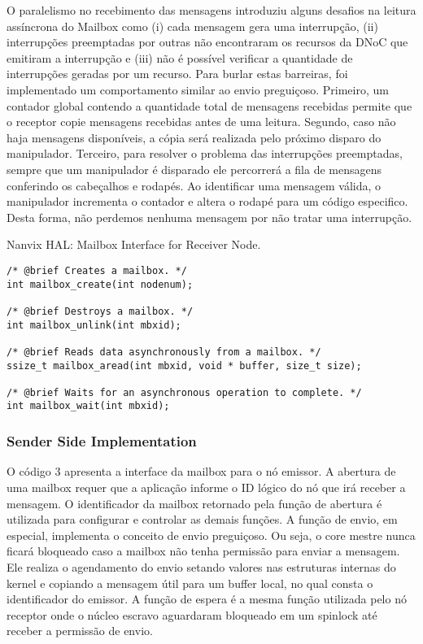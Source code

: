 				O paralelismo no recebimento das mensagens introduziu alguns desafios na leitura assíncrona do Mailbox como 
				(i) cada mensagem gera uma interrupção,
				(ii) interrupções preemptadas por outras não encontraram os recursos da DNoC que emitiram a interrupção e
				(iii) não é possível verificar a quantidade de interrupções geradas por um recurso.
				Para burlar estas barreiras, foi implementado um comportamento similar ao envio preguiçoso.
				Primeiro, um contador global contendo a quantidade total de mensagens recebidas permite que o receptor copie mensagens recebidas antes de uma leitura.
				Segundo, caso não haja mensagens disponíveis, a cópia será realizada pelo próximo disparo do manipulador.
				Terceiro, para resolver o problema das interrupções preemptadas, sempre que um manipulador é disparado ele percorrerá a fila de mensagens conferindo os cabeçalhos e rodapés.
				Ao identificar uma mensagem válida, o manipulador incrementa o contador e altera o rodapé para um código especifico.
				Desta forma, não perdemos nenhuma mensagem por não tratar uma interrupção.

\begin{listing}[!tb]
\caption{Nanvix HAL: Mailbox Interface for Receiver Node.}
\label{code:hal-mailbox-receiver}
\begin{verbatim}
/* @brief Creates a mailbox. */
int mailbox_create(int nodenum);

/* @brief Destroys a mailbox. */
int mailbox_unlink(int mbxid);

/* @brief Reads data asynchronously from a mailbox. */
ssize_t mailbox_aread(int mbxid, void * buffer, size_t size);

/* @brief Waits for an asynchronous operation to complete. */
int mailbox_wait(int mbxid);
\end{verbatim}
\end{listing}

			\subsubsection{Sender Side Implementation}

				O código 3 apresenta a interface da mailbox para o nó emissor.
				A abertura de uma mailbox requer que a aplicação informe o ID lógico do nó que irá receber a mensagem.
				O identificador da mailbox retornado pela função de abertura é utilizada para configurar e controlar as demais funções.
				A função de envio, em especial, implementa o conceito de envio preguiçoso.
				Ou seja, o core mestre nunca ficará bloqueado caso a mailbox não tenha permissão para enviar a mensagem.
				Ele realiza o agendamento do envio setando valores nas estruturas internas do kernel e copiando a mensagem útil para um buffer local, no qual consta o identificador do emissor.
				A função de espera é a mesma função utilizada pelo nó receptor onde o núcleo escravo aguardaram bloqueado em um spinlock até receber a permissão de envio.

